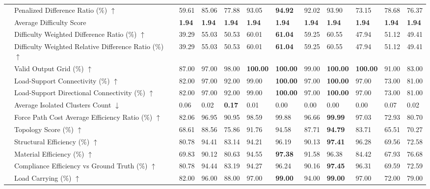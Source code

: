 \begin{table}[!h]
{\begin{tabular}{llllllllllll}
 & Penalized Difference Ratio (\%) $\uparrow$ & 59.61 & 85.06 & 77.88 & 93.05 & \textbf{94.92} & 92.02 & 93.90 & 73.15 & 78.68 & 76.37 \\
 & Average Difficulty Score & \textbf{1.94} & \textbf{1.94} & \textbf{1.94} & \textbf{1.94} & \textbf{1.94} & \textbf{1.94} & \textbf{1.94} & \textbf{1.94} & \textbf{1.94} & \textbf{1.94} \\
 & Difficulty Weighted Difference Ratio (\%) $\uparrow$ & 39.29 & 55.03 & 50.53 & 60.01 & \textbf{61.04} & 59.25 & 60.55 & 47.94 & 51.12 & 49.41 \\
 & Difficulty Weighted Relative Difference Ratio (\%) $\uparrow$ & 39.29 & 55.03 & 50.53 & 60.01 & \textbf{61.04} & 59.25 & 60.55 & 47.94 & 51.12 & 49.41 \\
 & Valid Output Grid (\%) $\uparrow$ & 87.00 & 97.00 & 98.00 & \textbf{100.00} & \textbf{100.00} & 99.00 & \textbf{100.00} & \textbf{100.00} & 91.00 & 83.00 \\
 & Load-Support Connectivity (\%) $\uparrow$ & 82.00 & 97.00 & 92.00 & 99.00 & \textbf{100.00} & 97.00 & \textbf{100.00} & 97.00 & 73.00 & 81.00 \\
 & Load-Support Directional Connectivity (\%) $\uparrow$ & 82.00 & 97.00 & 92.00 & 99.00 & \textbf{100.00} & 97.00 & \textbf{100.00} & 97.00 & 73.00 & 81.00 \\
 & Average Isolated Clusters Count $\downarrow$ & 0.06 & 0.02 & \textbf{0.17} & 0.01 & 0.00 & 0.00 & 0.00 & 0.00 & 0.07 & 0.02 \\
 & Force Path Cost Average Efficiency Ratio (\%) $\uparrow$ & 82.06 & 96.95 & 90.95 & 98.59 & 99.88 & 96.66 & \textbf{99.99} & 97.03 & 72.93 & 80.70 \\
 & Topology Score (\%) $\uparrow$ & 68.61 & 88.56 & 75.86 & 91.76 & 94.58 & 87.71 & \textbf{94.79} & 83.71 & 65.51 & 70.27 \\
 & Structural Efficiency (\%) $\uparrow$ & 80.78 & 94.41 & 83.14 & 94.21 & 96.19 & 90.13 & \textbf{97.41} & 96.28 & 69.56 & 72.58 \\
 & Material Efficiency (\%) $\uparrow$ & 69.83 & 90.12 & 80.63 & 94.55 & \textbf{97.38} & 91.58 & 96.38 & 84.42 & 67.93 & 76.68 \\
 & Compliance Efficiency vs Ground Truth (\%) $\uparrow$ & 80.78 & 94.44 & 83.19 & 94.27 & 96.24 & 90.16 & \textbf{97.45} & 96.31 & 69.59 & 72.59 \\
 & Load Carrying (\%) $\uparrow$ & 82.00 & 96.00 & 88.00 & 97.00 & \textbf{99.00} & 94.00 & \textbf{99.00} & 97.00 & 72.00 & 79.00 \\

\end{tabular}}
\end{table}
